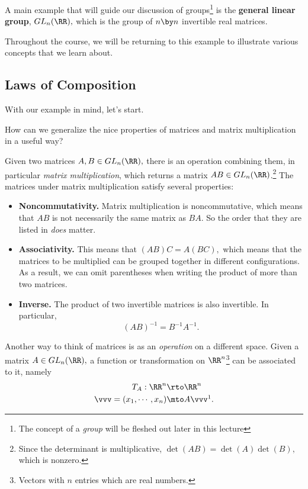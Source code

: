 \begin{example}[$GL_n(\RR)$]
A main example that will guide our discussion of groups\footnote{The concept of a \emph{group} will be fleshed out later in this lecture} is the \textbf{general linear group}, $GL_n(\RR),$ which is the group of $n \by n$ invertible real matrices. 
\end{example}

Throughout the course, we will be returning to this example to illustrate various concepts that we learn about.

\subsection{Laws of Composition}
With our example in mind, let's start.
\begin{qq}
How can we generalize the nice properties of matrices and matrix multiplication in a useful way?
\end{qq}

Given two matrices $A, B \in GL_n(\RR),$ there is an operation combining them, in particular \emph{matrix multiplication}, which returns a matrix $AB \in GL_n(\RR)$.\footnote{Since the determinant is multiplicative, $\det(AB) = \det(A)\det(B),$ which is nonzero.} The matrices under matrix multiplication satisfy several properties:
\begin{itemize}
    \item \textbf{Noncommutativity.} Matrix multiplication is noncommutative, which means that $AB$ is not necessarily the same matrix as $BA.$ So the order that they are listed in \emph{does} matter.
    \item \textbf{Associativity.} This means that $(AB)C = A(BC),$ which means that the matrices to be multiplied can be grouped together in different configurations. As a result, we can omit parentheses when writing the product of more than two matrices.
    
    \item \textbf{Inverse.} The product of two invertible matrices is also invertible. In particular, 
    \[
    (AB)^{-1} = B^{-1}A^{-1}.
    \]
\end{itemize}

Another way to think of matrices is as an \emph{operation} on a different space. Given a matrix $A \in GL_n(\RR),$ a function or transformation on $\RR^n$\footnote{Vectors with $n$ entries which are real numbers.} can be associated to it, namely 
\begin{align*}
    T_A: \RR^n &\rto \RR^n \\
    \vvv = (x_1, \cdots, x_n) &\mto A\vvv \footnotemark.
\end{align*}

